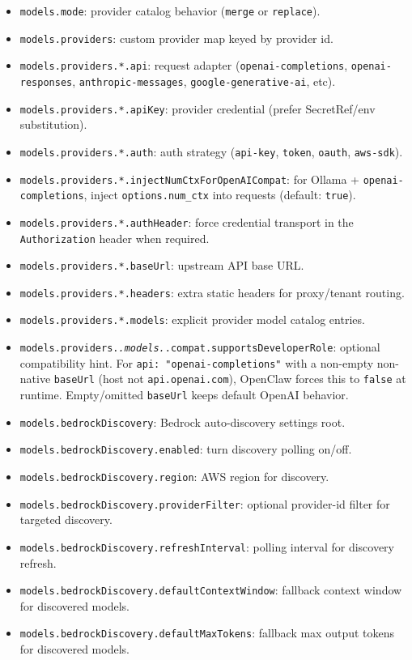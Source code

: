 \begin{itemize}
  \item \texttt{models.mode}: provider catalog behavior (\texttt{merge} or \texttt{replace}).
  \item \texttt{models.providers}: custom provider map keyed by provider id.
  \item \texttt{models.providers.*.api}: request adapter (\texttt{openai-completions}, \texttt{openai-responses}, \texttt{anthropic-messages}, \texttt{google-generative-ai}, etc).
  \item \texttt{models.providers.*.apiKey}: provider credential (prefer SecretRef/env substitution).
  \item \texttt{models.providers.*.auth}: auth strategy (\texttt{api-key}, \texttt{token}, \texttt{oauth}, \texttt{aws-sdk}).
  \item \texttt{models.providers.*.injectNumCtxForOpenAICompat}: for Ollama + \texttt{openai-completions}, inject \texttt{options.num\_ctx} into requests (default: \texttt{true}).
  \item \texttt{models.providers.*.authHeader}: force credential transport in the \texttt{Authorization} header when required.
  \item \texttt{models.providers.*.baseUrl}: upstream API base URL.
  \item \texttt{models.providers.*.headers}: extra static headers for proxy/tenant routing.
  \item \texttt{models.providers.*.models}: explicit provider model catalog entries.
  \item \texttt{models.providers.\textit{.models.}.compat.supportsDeveloperRole}: optional compatibility hint. For \texttt{api: "openai-completions"} with a non-empty non-native \texttt{baseUrl} (host not \texttt{api.openai.com}), OpenClaw forces this to \texttt{false} at runtime. Empty/omitted \texttt{baseUrl} keeps default OpenAI behavior.
  \item \texttt{models.bedrockDiscovery}: Bedrock auto-discovery settings root.
  \item \texttt{models.bedrockDiscovery.enabled}: turn discovery polling on/off.
  \item \texttt{models.bedrockDiscovery.region}: AWS region for discovery.
  \item \texttt{models.bedrockDiscovery.providerFilter}: optional provider-id filter for targeted discovery.
  \item \texttt{models.bedrockDiscovery.refreshInterval}: polling interval for discovery refresh.
  \item \texttt{models.bedrockDiscovery.defaultContextWindow}: fallback context window for discovered models.
  \item \texttt{models.bedrockDiscovery.defaultMaxTokens}: fallback max output tokens for discovered models.
\end{itemize}


